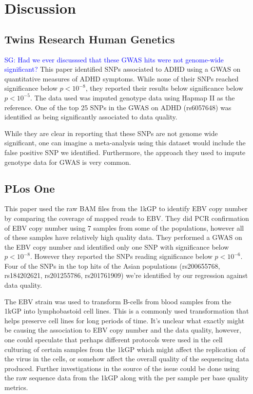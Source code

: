 \documentclass[9pt,lineno]{elife}
\newcommand{\sgcomment}[1]{\textcolor{blue}{SG: #1}}
\begin{document}
\section{Discussion}
			
\subsection{Twins Research Human Genetics}
\sgcomment{Had we ever discusssed that these GWAS hits were not genome-wide significant?}
This paper identified SNPs associated to ADHD using a GWAS on quantitative measures of ADHD symptoms.
While none of their SNPs reached significance below $ p < 10^{-8}$, they reported their results below significance below $ p < 10^{-5}$.
The data used was imputed genotype data using Hapmap II as the reference.
One of the top 25 SNPs in the GWAS on ADHD (rs6057648) was identified as being significantly associated to data quality.\cite{} 

While they are clear in reporting that these SNPs are not genome wide significant, one can imagine a meta-analysis using this dataset would include the false positive SNP we identified. 
Furthermore, the approach they used to impute genotype data for GWAS is very common.

\subsection{PLos One}
This paper used the raw BAM files from the 1kGP to identify EBV copy number by comparing the coverage of mapped reads to EBV.
They did PCR confirmation of EBV copy number using 7 samples from some of the populations, however all of these samples have relatively high quality data.
They performed a GWAS on the EBV copy number and identified only one SNP with significance below $ p < 10^{-8}$. 
However they reported the SNPs reading significance below $ p < 10^{-6}$. 
Four of the SNPs in the top hits of the Asian populations (rs200655768, rs184202621, rs201255786, rs201761909) we're identified by our regression against data quality. \cite{} 

The EBV strain was used to transform B-cells from blood samples from the 1kGP into lymphobastoid cell lines.
This is a commonly used transformation that helps preserve cell lines for long periods of time.
It's unclear what exactly might be causing the association to EBV copy number and the data quality, however, one could speculate that perhaps different protocols were used in the cell culturing of certain samples from the 1kGP which might affect the replication of the virus in the cells, or somehow affect the overall quality of the sequencing data produced.
Further investigations in the source of the issue could be done using the raw sequence data from the 1kGP along with the per sample per base quality metrics. 			
\end{document}
